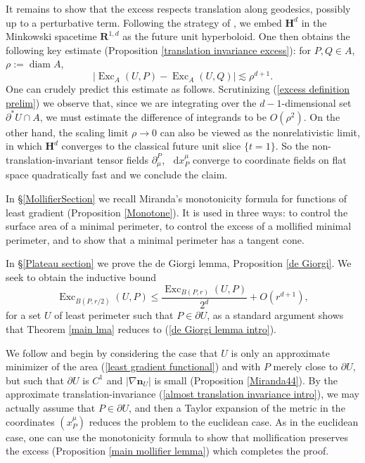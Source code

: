 \documentclass[final,12pt, leqno]{brownthesis}
\newcommand{\RR}{\mathbf{R}}
\newcommand{\Hyp}{\mathbf H}
\DeclareMathOperator{\diam}{diam}
\DeclareMathOperator{\Exc}{Exc}
\newcommand*\dif{\mathop{}\!\mathrm{d}}
\newcommand{\normal}{\mathbf n}
\theoremstyle{definition}
\numberwithin{equation}{section}
\begin{document}
It remains to show that the excess respects translation along geodesics, possibly up to a perturbative term.
Following the strategy of \cite{daskalopoulosPrep1}, we embed $\Hyp^d$ in the Minkowski spacetime $\RR^{1, d}$ as the future unit hyperboloid.
One then obtains the following key estimate (Proposition \ref{translation invariance excess}): for $P, Q \in A$, $\rho := \diam A$,
\begin{equation}\label{almost translation invariance intro}
|\Exc_A(U, P) - \Exc_A(U, Q)| \lesssim \rho^{d + 1}.
\end{equation}
One can crudely predict this estimate as follows.
Scrutinizing (\ref{excess definition prelim}) we observe that, since we are integrating over the $d-1$-dimensional set $\partial^* U \cap A$, we must estimate the difference of integrands to be $O(\rho^2)$.
On the other hand, the scaling limit $\rho \to 0$ can also be viewed as the nonrelativistic limit, in which $\Hyp^d$ converges to the classical future unit slice $\{t = 1\}$.
So the non-translation-invariant tensor fields $\partial_\mu^P$, $\dif x^\mu_P$ converge to coordinate fields on flat space quadratically fast and we conclude the claim.

In \S\ref{MollifierSection} we recall Miranda's monotonicity formula \cite[Teorema 3.2]{Miranda66} for functions of least gradient (Proposition \ref{Monotone}).
It is used in three ways: to control the surface area of a minimal perimeter, to control the excess of a mollified minimal perimeter, and to show that a minimal perimeter has a tangent cone.

In \S\ref{Plateau section} we prove the de Giorgi lemma, Proposition \ref{de Giorgi}.
We seek to obtain the inductive bound
\begin{equation}\label{de Giorgi lemma intro}
\Exc_{B(P, r/2)}(U, P) \leq \frac{\Exc_{B(P, r)}(U, P)}{2^d} + O(r^{d + 1}),
\end{equation}
for a set $U$ of least perimeter such that $P \in \partial U$, as a standard argument shows that Theorem \ref{main lma} reduces to (\ref{de Giorgi lemma intro}).

We follow \cite[Chapters 6-7]{Giusti77} and begin by considering the case that $U$ is only an approximate minimizer of the area (\ref{least gradient functional}) and with $P$ merely close to $\partial U$, but such that $\partial U$ is $C^1$ and $|\nabla \normal_U|$ is small (Proposition \ref{Miranda44}).
By the approximate translation-invariance (\ref{almost translation invariance intro}), we may actually assume that $P \in \partial U$, and then a Taylor expansion of the metric in the coordinates $(x^\mu_P)$ reduces the problem to the euclidean case.
As in the euclidean case, one can use the monotonicity formula to show that mollification preserves the excess (Proposition \ref{main mollifier lemma}) which completes the proof.
\end{document}
